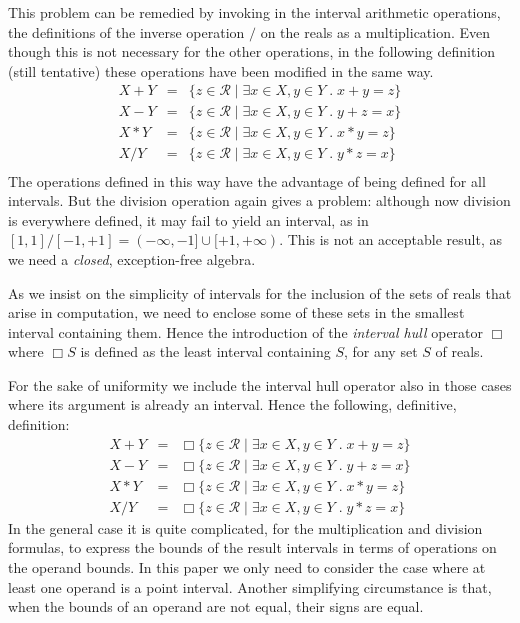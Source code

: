 \documentclass[11pt]{article}
\newcommand{\R}{\mathcal{R}}
\begin{document}
This problem can be remedied by invoking in the interval arithmetic
operations, the definitions of the inverse operation $/$ on the reals
as a multiplication.  Even though this is not necessary for the other
operations, in the following definition (still tentative) these
operations have been modified in the same way.
\begin{eqnarray*}
X + Y & = & \{ z \in \R \mid \exists x \in X,  y \in Y \;.\; x+y = z \}   \\
X - Y & = & \{ z \in \R \mid \exists x \in X,  y \in Y \;.\; y+z = x \}   \\
X * Y & = & \{ z \in \R \mid \exists x \in X,  y \in Y \;.\; x*y = z \}   \\
X / Y & = & \{ z \in \R \mid \exists x \in X,  y \in Y \;.\; y*z = x \}   \\
\end{eqnarray*}
The operations defined in this way have the advantage of being defined
for all intervals.
But the division operation again gives a problem:
although now division is everywhere defined,
it may fail to yield an interval, as in
$[1,1] / [-1,+1] = (-\infty, -1] \cup [+1, +\infty)$.
This is not an acceptable result, as we need a \emph{closed},
exception-free algebra.

As we insist on the simplicity of intervals for the inclusion of the
sets of reals that arise in computation,
we need to enclose some of these sets in the smallest
interval containing them.
Hence the introduction of the \emph{interval hull} operator $\Box$
where $\Box S$ is defined as the least interval containing $S$, for any
set $S$ of reals.

For the sake of uniformity we include the interval hull operator also
in those cases where its argument is already an interval. Hence the
following, definitive, definition:
\begin{eqnarray}
\label{intvOps}
X + Y & = &
\Box \{ z \in \R \mid \exists x \in X,  y \in Y \;.\; x+y = z \}
\nonumber \\
X - Y & = &
\Box \{ z \in \R \mid \exists x \in X,  y \in Y \;.\; y+z = x \} \\
X * Y & = &
\Box \{ z \in \R \mid \exists x \in X,  y \in Y \;.\; x*y = z \}
\nonumber \\
X / Y & = &
\Box \{ z \in \R \mid \exists x \in X,  y \in Y \;.\; y*z = x \}
\nonumber
\end{eqnarray}
In the general case it is quite complicated, for the multiplication
and division formulas, to express the bounds of the result intervals
in terms of operations on the operand bounds. In this paper we only
need to consider the case where at least one operand is a point
interval. Another simplifying circumstance is that, when the bounds of
an operand are not equal, their signs are equal.
\end{document}
